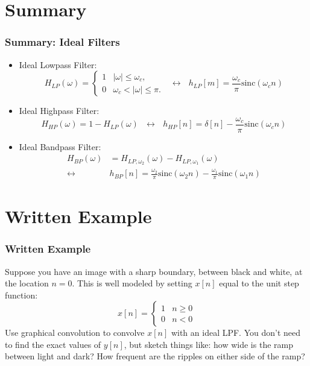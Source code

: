 \documentclass{beamer}
\begin{document}
\section[Summary]{Summary}
\setcounter{subsection}{1}

\begin{frame}
  \frametitle{Summary: Ideal Filters}
  \begin{itemize}
  \item Ideal Lowpass Filter:
    \[
    H_{LP}(\omega)
    = \begin{cases} 1& |\omega|\le\omega_c,\\
      0 & \omega_c<|\omega|\le\pi.
    \end{cases}~~~\leftrightarrow~~~
    h_{LP}[m]=\frac{\omega_c}{\pi}\mbox{sinc}(\omega_c n)
    \]
  \item Ideal Highpass Filter:
    \[
    H_{HP}(\omega)=1-H_{LP}(\omega)~~~\leftrightarrow~~~
    h_{HP}[n]=\delta[n]-\frac{\omega_c}{\pi}\mbox{sinc}(\omega_c n)
    \]
  \item Ideal Bandpass Filter:
    \begin{align*}
      H_{BP}(\omega)&=H_{LP,\omega_2}(\omega)-H_{LP,\omega_1}(\omega)\\
      \leftrightarrow
      &h_{BP}[n]=\frac{\omega_2}{\pi}\mbox{sinc}(\omega_2 n)-\frac{\omega_1}{\pi}\mbox{sinc}(\omega_1 n)
    \end{align*}
  \end{itemize}
\end{frame}

\section[Example]{Written Example}
\setcounter{subsection}{1}

\begin{frame}
  \frametitle{Written Example}

  Suppose you have an image with a sharp boundary, between black and
  white, at the location $n=0$.  This is well modeled by setting
  $x[n]$ equal to the unit step function:
  \begin{displaymath}
  x[n] = \begin{cases}1 & n\ge 0\\0&n<0\end{cases}
  \end{displaymath}
  Use graphical convolution to convolve $x[n]$ with an ideal LPF.  You
  don't need to find the exact values of $y[n]$, but sketch things
  like: how wide is the ramp between light and dark?  How frequent are
  the ripples on either side of the ramp?
\end{frame}
\end{document}
